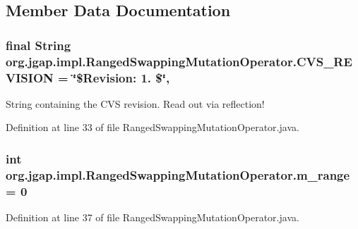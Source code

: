 \subsection{Member Data Documentation}
\hypertarget{classorg_1_1jgap_1_1impl_1_1_ranged_swapping_mutation_operator_a4c5317b6d011d40e412c929cfe902084}{
\subsubsection[{C\-V\-S\-\_\-\-R\-E\-V\-I\-S\-I\-O\-N}]{\setlength{\rightskip}{0pt plus 5cm}final String org.\-jgap.\-impl.\-Ranged\-Swapping\-Mutation\-Operator.\-C\-V\-S\-\_\-\-R\-E\-V\-I\-S\-I\-O\-N = \char`\"{}\$Revision\-: 1. \$\char`\"{}\hspace{0.3cm}{\ttfamily [static]}, {\ttfamily [private]}}}\label{classorg_1_1jgap_1_1impl_1_1_ranged_swapping_mutation_operator_a4c5317b6d011d40e412c929cfe902084}
String containing the C\-V\-S revision. Read out via reflection! 

Definition at line 33 of file Ranged\-Swapping\-Mutation\-Operator.\-java.

\hypertarget{classorg_1_1jgap_1_1impl_1_1_ranged_swapping_mutation_operator_a43cfba418a2cdc0ecc47741b0af3c8d0}{
\subsubsection[{m\-\_\-range}]{\setlength{\rightskip}{0pt plus 5cm}int org.\-jgap.\-impl.\-Ranged\-Swapping\-Mutation\-Operator.\-m\-\_\-range = 0\hspace{0.3cm}{\ttfamily [private]}}}\label{classorg_1_1jgap_1_1impl_1_1_ranged_swapping_mutation_operator_a43cfba418a2cdc0ecc47741b0af3c8d0}


Definition at line 37 of file Ranged\-Swapping\-Mutation\-Operator.\-java.



